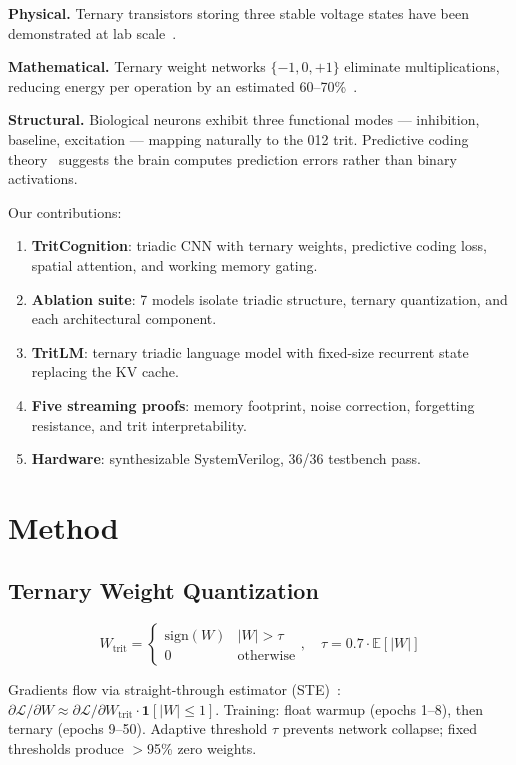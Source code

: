 \documentclass[10pt,twocolumn]{article}
\newcommand{\tritnet}{TritCognition}
\newcommand{\tritlm}{TritLM}
\begin{document}
\textbf{Physical.} Ternary transistors storing three stable voltage states have
been demonstrated at lab scale~\cite{shukla2019}.

\textbf{Mathematical.} Ternary weight networks $\{-1, 0, +1\}$ eliminate
multiplications, reducing energy per operation by an estimated
60--70\%~\cite{rastegari2016, andri2018}.

\textbf{Structural.} Biological neurons exhibit three functional modes ---
inhibition, baseline, excitation --- mapping naturally to the 012 trit.
Predictive coding theory~\cite{rao1999, friston2005} suggests the brain
computes prediction errors rather than binary activations.

\noindent Our contributions:
\begin{enumerate}
  \item \textbf{\tritnet}: triadic CNN with ternary weights, predictive
        coding loss, spatial attention, and working memory gating.
  \item \textbf{Ablation suite}: 7 models isolate triadic structure,
        ternary quantization, and each architectural component.
  \item \textbf{\tritlm}: ternary triadic language model with
        fixed-size recurrent state replacing the KV cache.
  \item \textbf{Five streaming proofs}: memory footprint, noise correction,
        forgetting resistance, and trit interpretability.
  \item \textbf{Hardware}: synthesizable SystemVerilog, 36/36 testbench pass.
\end{enumerate}

\section{Method}

\subsection{Ternary Weight Quantization}

\begin{equation}
  W_\text{trit} = \begin{cases}
    \text{sign}(W) & |W| > \tau \\
    0              & \text{otherwise}
  \end{cases}, \quad \tau = 0.7 \cdot \mathbb{E}[|W|]
\end{equation}

Gradients flow via straight-through estimator (STE)~\cite{bengio2013}:
$\partial\mathcal{L}/\partial W \approx \partial\mathcal{L}/\partial
W_\text{trit} \cdot \mathbf{1}[|W| \leq 1]$.
Training: float warmup (epochs 1--8), then ternary (epochs 9--50).
Adaptive threshold $\tau$ prevents network collapse; fixed thresholds
produce $>$95\% zero weights.
\end{document}
